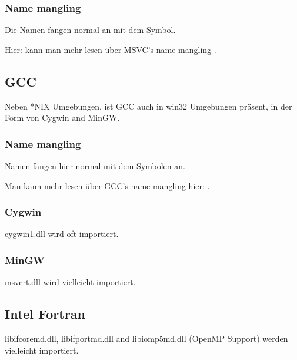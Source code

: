 \subsubsection{Name mangling} 

Die Namen fangen normal an mit dem  Symbol.

Hier:  kann man mehr lesen über MSVC's \gls{name mangling} . 

\subsection{GCC}

Neben *NIX Umgebungen, ist GCC auch in win32 Umgebungen präsent, in der Form von Cygwin and MinGW. 

\subsubsection{Name mangling} 

Namen fangen hier normal mit dem  Symbolen an.

Man kann mehr lesen über GCC's \gls{name mangling} hier: .

\subsubsection{Cygwin}

cygwin1.dll wird oft importiert.

\subsubsection{MinGW}

msvcrt.dll wird vielleicht importiert.

\subsection{Intel Fortran}


libifcoremd.dll, libifportmd.dll and libiomp5md.dll (OpenMP Support) werden vielleicht importiert.

